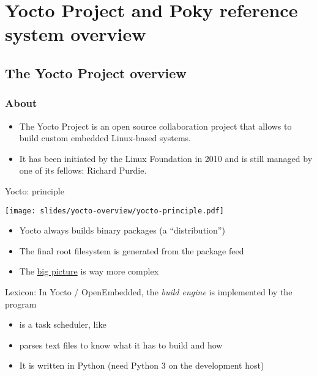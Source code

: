 \section{Yocto Project and Poky reference system overview}

\subsection{The Yocto Project overview}

\begin{frame}
  \frametitle{About}
  \begin{itemize}
  \item The Yocto Project is an open source collaboration project
        that allows to build custom embedded Linux-based systems.
  \item It has been initiated by the Linux Foundation in 2010 and is
    still managed by one of its fellows: Richard Purdie.
  \end{itemize}
\end{frame}

\begin{frame}{Yocto: principle}
  \begin{center}
    \texttt{[image: slides/yocto-overview/yocto-principle.pdf]}
  \end{center}
  \begin{itemize}
  \item Yocto always builds binary packages (a ``distribution'')
  \item The final root filesystem is generated from the package feed
  \item The \href{https://docs.yoctoproject.org/_images/YP-flow-diagram.png}
                 {big picture} is way more complex
  \end{itemize}
\end{frame}

\begin{frame}{Lexicon: }
  In Yocto / OpenEmbedded, the {\em build engine} is implemented by the
   program
  \begin{itemize}
    \item {} is a task scheduler, like 
    \item {} parses text files
      to know what it has to build and how
    \item It is written in Python (need Python 3 on the development host)
  \end{itemize}
\end{frame}

